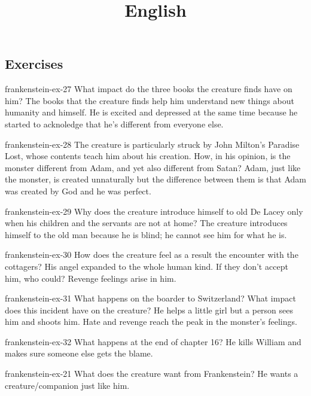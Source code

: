 \documentclass[preview]{standalone}
\begin{document}
\title{English}
\genpage

\subsection{Exercises}

\begin{snippetexercise}{frankenstein-ex-27}
    {What impact do the three books the creature finds have on him?}
    The books that the creature finds help him understand new things
    about humanity and himself. He is excited and depressed at the same time because
    he started to acknoledge that he's different from everyone else.
\end{snippetexercise}

\begin{snippetexercise}{frankenstein-ex-28}
    {The creature is particularly struck by John Milton's Paradise Lost, whose contents teach him about his
    creation. How, in his opinion, is the monster different from Adam, and yet also different from Satan?}
    Adam, just like the monster, is created unnaturally but the difference
    between them is that Adam was created by God and he was perfect. 
\end{snippetexercise}

\begin{snippetexercise}{frankenstein-ex-29}
    {Why does the creature introduce himself to old De Lacey only when his children and the servants are not
    at home?}
    The creature introduces himself to the old man because he is blind; he cannot see him
    for what he is.
\end{snippetexercise}

\begin{snippetexercise}{frankenstein-ex-30}
    {How does the creature feel as a result the encounter with the cottagers?}
    His angel expanded to the whole human kind.
    If they don't accept him, who could? Revenge feelings
    arise in him. 
\end{snippetexercise}

\begin{snippetexercise}{frankenstein-ex-31}
    {What happens on the boarder to Switzerland? What impact does this incident have on the creature?}
    He helps a little girl but a person sees him and shoots him.
    Hate and revenge reach the peak in the monster's feelings.
\end{snippetexercise}

\begin{snippetexercise}{frankenstein-ex-32}
    {What happens at the end of chapter 16?}
    He kills William and makes sure someone else gets the blame.
\end{snippetexercise}

\begin{snippetexercise}{frankenstein-ex-21}
    {What does the creature want from Frankenstein?}
    He wants a creature/companion just like him.
\end{snippetexercise}
\end{document}
